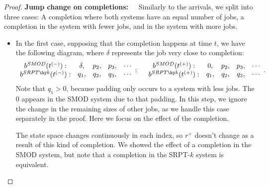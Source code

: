 \documentclass[acmsmall]{acmart}
\begin{document}
\begin{proof}
    
    \textbf{Jump change on completions:~~} 
    Similarly to the arrivals, we split into three cases: A completion where both systems have an equal number of jobs, a completion in the system with fewer jobs, and in the system with more jobs. 
    \begin{itemize}
        \item In the first case, supposing that the completion happens at time $t$, we have the following diagram, where $\delta$ represents the job very close to completion:
    \begin{align*}
        \begin{array}{c} 
            b^{SMOD}(t^{(-)}): \\ b^{SRPT\hy k}(t^{(-)}): \\
        \end{array}
        \begin{array}{cccc}
            \delta, & p_2, & p_3, & \cdots \\
            q_1, & q_2, & q_3, & \cdots \\
        \end{array} ;
        \quad
        \begin{array}{c} 
            b^{SMOD}(t^{(+)}): \\ b^{SRPT\hy k}(t^{(+)}): \\
        \end{array}
        \begin{array}{cccc}
            0, & p_2, & p_3, & \cdots \\
            q_1, & q_2, & q_3, & \cdots \\
        \end{array} .
    \end{align*}
    Note that $q_1 > 0$, because padding only occurs to a system with less jobs. The $0$ appears in the SMOD system due to that padding. In this step, we ignore the change in the remaining sizes of other jobs, as we handle this case separately in the proof. Here we focus on the effect of the completion. 
    
    The state space changes continuously in each index, so $r^+$ doesn't change as a result of this kind of completion. We showed the effect of a completion in the SMOD system, but note that a completion in the SRPT-$k$ system is equivalent.


\end{itemize}
\end{proof}
\end{document}
